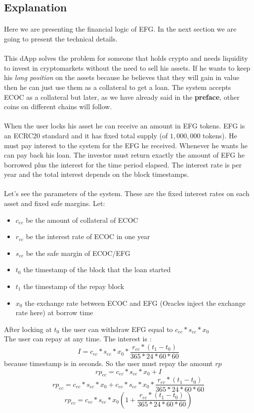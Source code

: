 \documentclass{article}
\begin{document}
\subsection{Explanation}
\paragraph{ }
Here we are presenting the financial logic of EFG. In the next section we are going to present the technical details.
\paragraph{ }
This dApp solves the problem for someone that holds crypto and needs liquidity to invest in cryptomarkets without the need to sell his assets. If he wants to keep his \emph{long position} on the assets because he believes that they will gain in value then he can just use them as a collateral to get a loan. The system accepts ECOC as a collateral but later, as we have already said in the \textbf{preface}, other coins on different chains will follow.
\paragraph{ }
When the user locks his asset he can receive an amount in EFG tokens. EFG is an ECRC20 standard and it has fixed total supply (of $1,000,000$ tokens). He must pay interest to the system for the EFG he received. Whenever he wants he can pay back his loan. The investor must return exactly the amount of EFG he borrowed plus the interest for the time period elapsed. The interest rate is per year and the total interest depends on the block timestamps.
\paragraph{ }
Let's see the parameters of the system. These are the fixed interest rates on each asset and fixed safe margins. 
Let:
\begin{itemize}
\item $c_{ec}$ be the amount of collateral of ECOC
\item $r_{ec}$ be the interest rate of ECOC in one year
\item $s_{ec}$ be the safe margin of ECOC/EFG
\item $t_{0}$ the timestamp of the block that the loan started
\item $t_{1}$ the timestamp of the repay block
\item $x_{0}$ the exchange rate between ECOC and EFG (Oracles inject the exchange rate here) at borrow time
\end{itemize}
After locking at $t_{0}$ the user can withdraw EFG equal to $c_{ec}*s_{ec}*x_{0}$\\
The user can repay at any time. The interest is :\\
$$I =c_{ec}*s_{ec}*x_{0}*  \frac{r_{ec}*(t_{1}-t_{0})}{365*24*60*60}$$
because timestamp is in seconds. So the user must repay the amount $rp$
$$rp_{ec} = c_{ec}*s_{ec}*x_{0} + I $$
$$rp_{ec} = c_{ec}*s_{ec}*x_{0} + c_{ec}*s_{ec}*x_{0}*  \frac{r_{ec}*(t_{1}-t_{0})}{365*24*60*60} $$
$$rp_{ec} = c_{ec}*s_{ec}*x_{0}(1 + \frac{r_{ec}*(t_{1}-t_{0})}{365*24*60*60})$$
\end{document}

